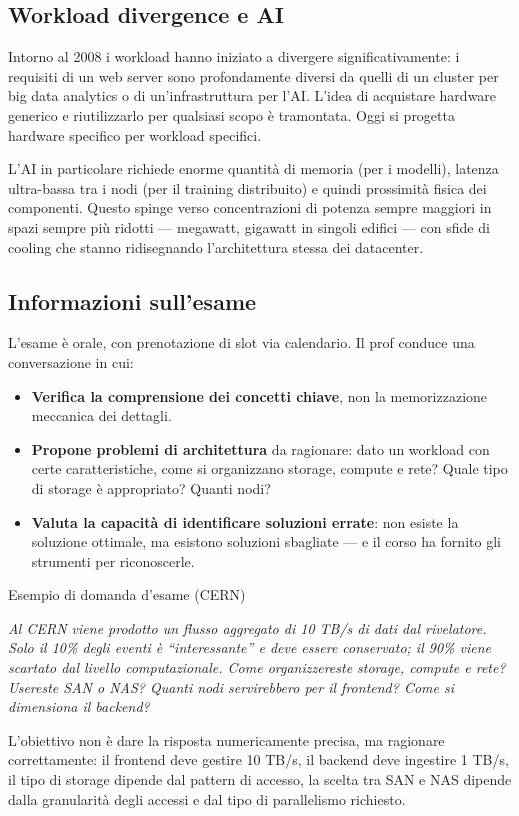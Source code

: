 \documentclass[
  italian,
  openany]{book}
\providecommand{\tightlist}{%
  \setlength{\itemsep}{0pt}\setlength{\parskip}{0pt}}
\begin{document}
\subsection{Workload divergence e AI}\label{workload-divergence-e-ai}

Intorno al 2008 i workload hanno iniziato a divergere
significativamente: i requisiti di un web server sono profondamente
diversi da quelli di un cluster per big data analytics o di
un'infrastruttura per l'AI. L'idea di acquistare hardware generico e
riutilizzarlo per qualsiasi scopo è tramontata. Oggi si progetta
hardware specifico per workload specifici.

L'AI in particolare richiede enorme quantità di memoria (per i modelli),
latenza ultra-bassa tra i nodi (per il training distribuito) e quindi
prossimità fisica dei componenti. Questo spinge verso concentrazioni di
potenza sempre maggiori in spazi sempre più ridotti --- megawatt,
gigawatt in singoli edifici --- con sfide di cooling che stanno
ridisegnando l'architettura stessa dei datacenter.

\subsection{Informazioni sull'esame}\label{informazioni-sullesame}

L'esame è orale, con prenotazione di slot via calendario. Il prof
conduce una conversazione in cui:

\begin{itemize}
\tightlist
\item
  \textbf{Verifica la comprensione dei concetti chiave}, non la
  memorizzazione meccanica dei dettagli.
\item
  \textbf{Propone problemi di architettura} da ragionare: dato un
  workload con certe caratteristiche, come si organizzano storage,
  compute e rete? Quale tipo di storage è appropriato? Quanti nodi?
\item
  \textbf{Valuta la capacità di identificare soluzioni errate}: non
  esiste la soluzione ottimale, ma esistono soluzioni sbagliate --- e il
  corso ha fornito gli strumenti per riconoscerle.
\end{itemize}

\begin{callouttip}{Esempio di domanda d’esame (CERN)}

\emph{Al CERN viene prodotto un flusso aggregato di 10 TB/s di dati dal
rivelatore. Solo il 10\% degli eventi è ``interessante'' e deve essere
conservato; il 90\% viene scartato dal livello computazionale. Come
organizzereste storage, compute e rete? Usereste SAN o NAS? Quanti nodi
servirebbero per il frontend? Come si dimensiona il backend?}

L'obiettivo non è dare la risposta numericamente precisa, ma ragionare
correttamente: il frontend deve gestire 10 TB/s, il backend deve
ingestire 1 TB/s, il tipo di storage dipende dal pattern di accesso, la
scelta tra SAN e NAS dipende dalla granularità degli accessi e dal tipo
di parallelismo richiesto.

\end{callouttip}

\newpage

\backmatter
\end{document}
